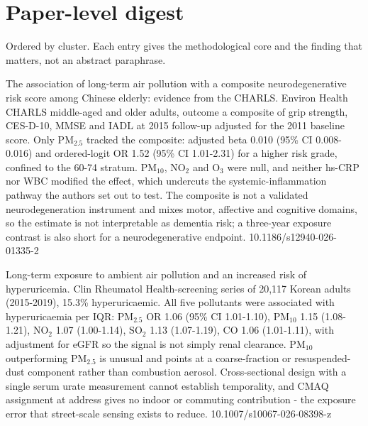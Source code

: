 \documentclass[10pt]{article}
\begin{document}
\clearpage

\section*{\sffamily\bfseries\color{Deep}Paper-level digest}
\vspace{-1.5mm}{\color{Amber}\rule{\linewidth}{1.1pt}}\vspace{1mm}

{\fontsize{7.4}{9}\selectfont\color{Slate}Ordered by cluster. Each entry gives the
methodological core and the finding that matters, not an abstract paraphrase.\par}


{The association of long-term air pollution with a composite neurodegenerative risk score among Chinese elderly: evidence from the CHARLS.}
{Environ Health}
{CHARLS middle-aged and older adults, outcome a composite of grip strength, CES-D-10, MMSE and IADL at 2015 follow-up adjusted for the 2011 baseline score. Only PM$_{2.5}$ tracked the composite: adjusted beta 0.010 (95\% CI 0.008-0.016) and ordered-logit OR 1.52 (95\% CI 1.01-2.31) for a higher risk grade, confined to the 60-74 stratum. PM$_{10}$, NO$_2$ and O$_3$ were null, and neither hs-CRP nor WBC modified the effect, which undercuts the systemic-inflammation pathway the authors set out to test. The composite is not a validated neurodegeneration instrument and mixes motor, affective and cognitive domains, so the estimate is not interpretable as dementia risk; a three-year exposure contrast is also short for a neurodegenerative endpoint.}
{10.1186/s12940-026-01335-2}


{Long-term exposure to ambient air pollution and an increased risk of hyperuricemia.}
{Clin Rheumatol}
{Health-screening series of 20,117 Korean adults (2015-2019), 15.3\% hyperuricaemic. All five pollutants were associated with hyperuricaemia per IQR: PM$_{2.5}$ OR 1.06 (95\% CI 1.01-1.10), PM$_{10}$ 1.15 (1.08-1.21), NO$_2$ 1.07 (1.00-1.14), SO$_2$ 1.13 (1.07-1.19), CO 1.06 (1.01-1.11), with adjustment for eGFR so the signal is not simply renal clearance. PM$_{10}$ outperforming PM$_{2.5}$ is unusual and points at a coarse-fraction or resuspended-dust component rather than combustion aerosol. Cross-sectional design with a single serum urate measurement cannot establish temporality, and CMAQ assignment at address gives no indoor or commuting contribution - the exposure error that street-scale sensing exists to reduce.}
{10.1007/s10067-026-08398-z}
\end{document}
